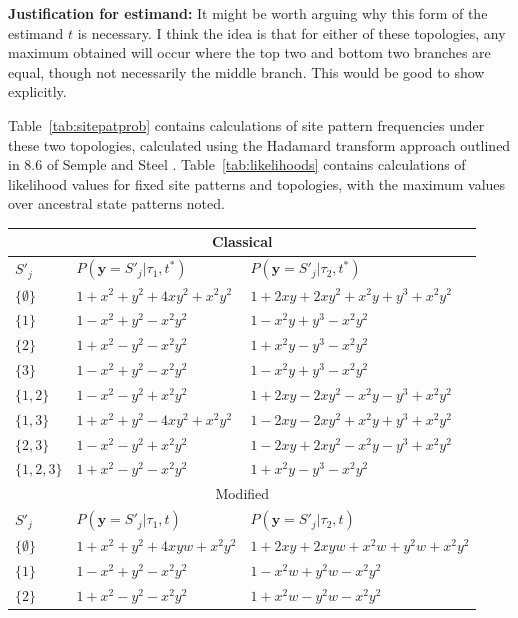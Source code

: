 \documentclass[a4paper]{article}
\newcommand{\alignmentColumn}{\mathbf{y}}
\newcommand{\siteSplit}{S'}
\begin{document}
\textbf{Justification for estimand:} It might be worth arguing why this form of the estimand $t$ is necessary.
I think the idea is that for either of these topologies, any maximum obtained will occur where the top two and bottom two branches are equal, though not necessarily the middle branch.
This would be good to show explicitly.

Table~\ref{tab:sitepatprob} contains calculations of site pattern frequencies under these two topologies, calculated using the Hadamard transform approach outlined in 8.6 of Semple and Steel \cite{Semple2003-em}.
Table~\ref{tab:likelihoods} contains calculations of likelihood values for fixed site patterns and topologies, with the maximum values over ancestral state patterns noted.

\begin{table}
\centering
\begin{tabular}{|l|l|l|}
\multicolumn{3}{c}{Classical}\\
    \hline
$\siteSplit_j$   &$P(\alignmentColumn=\siteSplit_j|\tau_1,t^*)$&$P(\alignmentColumn=\siteSplit_j|\tau_2,t^*)$\\
    \hline
    $\{\emptyset\}$&$1+x^2+y^2+4xy^2+x^2y^2$&$1+2xy+2xy^2+x^2y+y^3+x^2y^2$\\
    $\{1\}$        &$1-x^2+y^2-x^2y^2$&$1-x^2y+y^3-x^2y^2$\\
    $\{2\}$        &$1+x^2-y^2-x^2y^2$&$1+x^2y-y^3-x^2y^2$\\
    $\{3\}$        &$1-x^2+y^2-x^2y^2$&$1-x^2y+y^3-x^2y^2$\\
    $\{1,2\}$      &$1-x^2-y^2+x^2y^2$&$1+2xy-2xy^2-x^2y-y^3+x^2y^2$\\
    $\{1,3\}$      &$1+x^2+y^2-4xy^2+x^2y^2$&$1-2xy-2xy^2+x^2y+y^3+x^2y^2$\\
    $\{2,3\}$      &$1-x^2-y^2+x^2y^2$&$1-2xy+2xy^2-x^2y-y^3+x^2y^2$\\
    $\{1,2,3\}$    &$1+x^2-y^2-x^2y^2$&$1+x^2y-y^3-x^2y^2$\\
    \hline
\multicolumn{3}{c}{Modified}\\
    \hline
$\siteSplit_j$   &$P(\alignmentColumn=\siteSplit_j|\tau_1,t)$&$P(\alignmentColumn=\siteSplit_j|\tau_2,t)$\\
    \hline
    $\{\emptyset\}$&$1+x^2+y^2+4xyw+x^2y^2$&$1+2xy+2xyw+x^2w+y^2w+x^2y^2$\\
    $\{1\}$        &$1-x^2+y^2-x^2y^2$&$1-x^2w+y^2w-x^2y^2$\\
    $\{2\}$        &$1+x^2-y^2-x^2y^2$&$1+x^2w-y^2w-x^2y^2$\\

\end{tabular}
\end{table}
\end{document}
